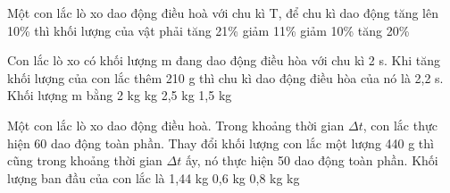 \begin{ex}%
Một con lắc lò xo dao động điều hoà với chu kì T, để chu kì dao động tăng lên 10\% thì khối lượng của vật phải
\choice
{\True tăng 21\%}
{giảm 11\%}
{giảm 10\%}
{tăng 20\%}
\end{ex} 
\begin{ex}%
Con lắc lò xo có khối lượng m đang dao động điều hòa với chu kì 2 s. Khi tăng khối lượng của con lắc thêm 210 g thì chu kì dao động điều hòa của nó là 2,2 s. Khối lượng m bằng
\choice
{2 kg}
{ kg}
{2,5 kg}
{1,5 kg}

\end{ex} 

\begin{ex}%
Một con lắc lò xo dao động điều hoà. Trong khoảng thời gian  $\Delta t$, con lắc thực hiện 60 dao động toàn phần. Thay đổi khối lượng con lắc một lượng 440 g thì cũng trong khoảng thời gian $\Delta t$ ấy, nó thực hiện 50 dao động toàn phần. Khối lượng ban đầu của con lắc là
\choice
{1,44 kg}
{0,6 kg}
{0,8 kg}
{ kg}
\end{ex} 



